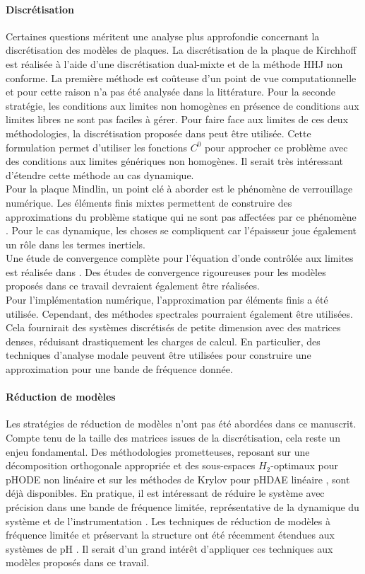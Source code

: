 \paragraph{Discrétisation}
Certaines questions méritent une analyse plus approfondie concernant la discrétisation des modèles de plaques. La discrétisation de la plaque de Kirchhoff est réalisée à l'aide d'une discrétisation dual-mixte et de la méthode HHJ non conforme. La première méthode est coûteuse d'un point de vue computationnelle et pour cette raison n'a pas été analysée dans la littérature. Pour la seconde stratégie, les conditions aux limites non homogènes en présence de conditions aux limites libres ne sont pas faciles à gérer. Pour faire face aux limites de ces deux méthodologies, la discrétisation proposée dans \cite{rafetseder2018siam} peut être utilisée. Cette formulation permet d'utiliser les fonctions $ C^0$ pour approcher ce problème avec des conditions aux limites génériques non homogènes. Il serait très intéressant d'étendre cette méthode au cas dynamique. \\ Pour la plaque Mindlin, un point clé à aborder est le phénomène de verrouillage numérique. Les éléments finis mixtes permettent de construire des approximations du problème statique qui ne sont pas affectées par ce phénomène \cite{veiga2013}. Pour le cas dynamique, les choses se compliquent car l'épaisseur joue également un rôle dans les termes inertiels. \\ Une étude de convergence complète pour l'équation d'onde contrôlée aux limites est réalisée dans \cite{haine2020numerical}. Des études de convergence rigoureuses pour les modèles proposés dans ce travail devraient également être réalisées. \\ Pour l'implémentation numérique, l'approximation par éléments finis a été utilisée. Cependant, des méthodes spectrales pourraient également être utilisées. Cela fournirait des systèmes discrétisés de petite dimension avec des matrices denses, réduisant drastiquement les charges de calcul. En particulier, des techniques d'analyse modale peuvent être utilisées pour construire une approximation pour une bande de fréquence donnée.

\paragraph{Réduction de modèles}
Les stratégies de réduction de modèles n'ont pas été abordées dans ce manuscrit. Compte tenu de la taille des matrices issues de la discrétisation, cela reste un enjeu fondamental. Des méthodologies prometteuses, reposant sur une décomposition orthogonale appropriée et des sous-espaces $H_2$-optimaux pour pHODE  non linéaire \cite{chaturantabut2016} et sur les méthodes de Krylov pour pHDAE linéaire \cite{egger2018}, sont déjà disponibles. En pratique, il est intéressant de réduire le système avec précision dans une bande de fréquence limitée, représentative de la dynamique du système et de l'instrumentation \cite{vuillemin2014frequency}. Les techniques de réduction de modèles à fréquence limitée et préservant la structure ont été récemment étendues aux systèmes de pH \cite{xu2020sp}. Il serait d'un grand intérêt d'appliquer ces techniques aux modèles proposés dans ce travail.

